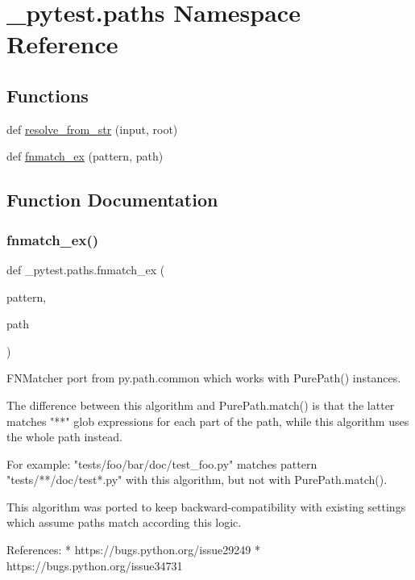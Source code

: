\hypertarget{namespace__pytest_1_1paths}{}\section{\+\_\+pytest.\+paths Namespace Reference}
\label{namespace__pytest_1_1paths}
\subsection*{Functions}
\begin{DoxyCompactItemize}
\item 
def \hyperlink{namespace__pytest_1_1paths_a3fbb95fdbcdb06a57937bbaeeb429189}{resolve\+\_\+from\+\_\+str} (input, root)
\item 
def \hyperlink{namespace__pytest_1_1paths_afa9a212d6f5062d0dddae91faed48136}{fnmatch\+\_\+ex} (pattern, path)
\end{DoxyCompactItemize}


\subsection{Function Documentation}
\mbox{\label{namespace__pytest_1_1paths_afa9a212d6f5062d0dddae91faed48136}} 
\subsubsection{\texorpdfstring{fnmatch\+\_\+ex()}{fnmatch\_ex()}}
{\footnotesize\ttfamily def \+\_\+pytest.\+paths.\+fnmatch\+\_\+ex (\begin{DoxyParamCaption}\item[{}]{pattern,  }\item[{}]{path }\end{DoxyParamCaption})}

\begin{DoxyVerb}FNMatcher port from py.path.common which works with PurePath() instances.

The difference between this algorithm and PurePath.match() is that the latter matches "**" glob expressions
for each part of the path, while this algorithm uses the whole path instead.

For example:
    "tests/foo/bar/doc/test_foo.py" matches pattern "tests/**/doc/test*.py" with this algorithm, but not with
    PurePath.match().

This algorithm was ported to keep backward-compatibility with existing settings which assume paths match according
this logic.

References:
* https://bugs.python.org/issue29249
* https://bugs.python.org/issue34731
\end{DoxyVerb}
 \mbox{\label{namespace__pytest_1_1paths_a3fbb95fdbcdb06a57937bbaeeb429189}} 
